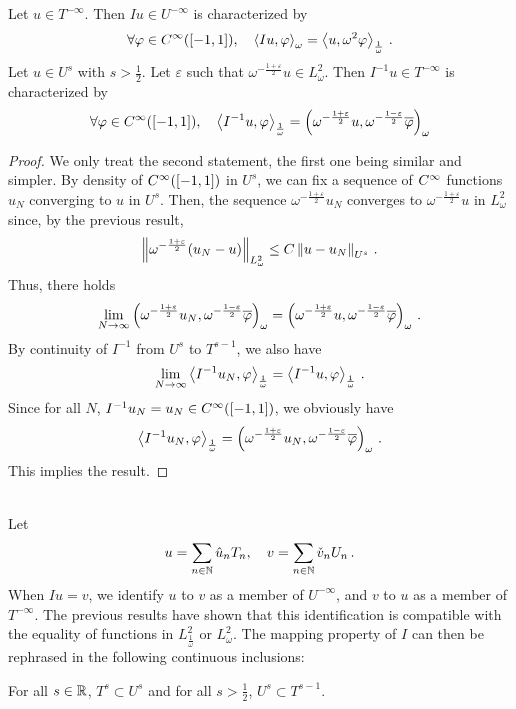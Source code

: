\documentclass[a4paper]{article}
\begin{document}
\begin{Cor}
	Let $u \in T^{-\infty}$. Then $Iu \in U^{-\infty}$ is characterized by
	\[\forall \varphi\in C^{\infty}([-1,1]),\quad \left\langle Iu,\varphi\right\rangle_\omega = \left\langle u,\omega^2 \varphi\right\rangle_\frac{1}{\omega}\,.\]
	Let $u \in U^s$ with $s > \frac{1}{2}$. Let $\varepsilon$ such that $\omega^{-\frac{1+ \varepsilon}{2} }u \in L^2_\omega$. Then $I^{-1}u \in T^{-\infty}$ is characterized by 
	\[\forall \varphi\in C^{\infty}([-1,1]), \quad \left\langle I^{-1}u,\varphi\right\rangle_\frac{1}{\omega}=\left( {\omega^{-\frac{1+ \varepsilon}{2} }u},{\omega^{-\frac{1- \varepsilon}{2} }\overline \varphi}\right)_\omega \]
\end{Cor}
\begin{proof}
	We only treat the second statement, the first one being similar and simpler. By density of $C^{\infty}([-1,1])$ in $U^s$, we can fix a sequence of $C^{\infty}$ functions $u_N$ converging to $u$ in $U^s$. Then, the sequence $\omega^{-\frac{1 + \varepsilon}{2}}u_N$ converges to $\omega^{-\frac{1 + \varepsilon}{2}}u$ in $L^2_\omega$ since, by the previous result,
	\[\left\|\omega^{-\frac{1+ \varepsilon}{2}}(u_N - u)\right\|_{L^2_\omega} \leq C \left\|u - u_N\right\|_{U^{s}}\,.\]
	Thus, there holds 
	\[\lim_{N \to \infty} \left( {\omega^{-\frac{1+ \varepsilon}{2} }u_N},{\omega^{-\frac{1- \varepsilon}{2} }\overline \varphi}\right)_\omega = \left( {\omega^{-\frac{1+ \varepsilon}{2} }u},{\omega^{-\frac{1- \varepsilon}{2} }\overline \varphi}\right)_\omega\,.\]
	By continuity of $I^{-1}$ from $U^s$ to $T^{s - 1}$, we also have 
	\[\lim_{N \to \infty}\left\langle I^{-1} u_N,\varphi\right\rangle_{\frac{1}{\omega}} = \left\langle I^{-1} u,\varphi\right\rangle_{\frac{1}{\omega}}\,. \]
	Since for all $N$, $I^{-1}u_N = u_N \in C^{\infty}([-1,1])$, we obviously have 
	\[\left\langle I^{-1}u_N,\varphi\right\rangle_{\frac{1}{\omega}} =  \left( {\omega^{-\frac{1+ \varepsilon}{2} }u_N},{\omega^{-\frac{1- \varepsilon}{2} }\overline \varphi}\right)_\omega\,.\] 
	This implies the result.
\end{proof}
\noindent{}\\
\noindent Let
\[u = \sum_{n \in \mathbb{N} } \hat{u}_n T_n, \quad v = \sum_{n \in \mathbb{N}} \check{v}_n U_n\,.\]
When $Iu = v$, we identify $u$ to $v$ as a member of $U^{-\infty}$, and $v$ to $u$ as a member of $T^{-\infty}$. The previous results have shown that this identification is compatible with the equality of functions in $L^2_\frac{1}{\omega}$ or $L^2_\omega$. The mapping property of $I$ can then be rephrased in the following continuous inclusions:
\begin{Cor}
	For all $s \in \mathbb{R}$, $T^s \subset U^s$ and for all $s > \frac{1}{2}$, $U^s \subset T^{s-1}$.    
\end{Cor}
\end{document}
